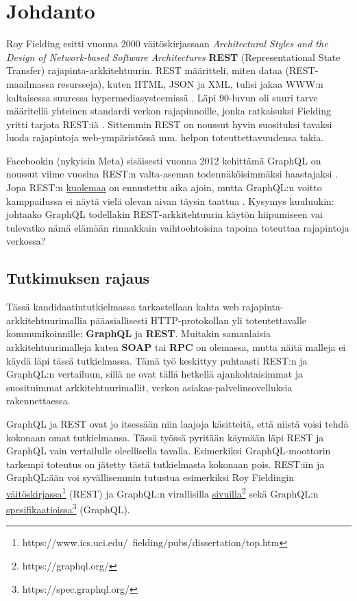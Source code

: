 \chapter{Johdanto} \label{Johdanto}

\setlength{\parindent}{0em}
\setlength{\parskip}{1em}

Roy Fielding esitti vuonna 2000 väitöskirjassaan \textit{Architectural Styles and the Design of Network-based Software Architectures} \textbf{REST} (Representational State Transfer) rajapinta-arkkitehtuurin. REST määritteli, miten dataa (REST-maailmassa resursseja), kuten HTML, JSON ja XML, tulisi jakaa WWW:n kaltaisessa suuressa hypermediasysteemissä \cite{FieldingRThesis}. Läpi 90-luvun oli suuri tarve määritellä yhteinen standardi verkon rajapinnoille, jonka ratkaisuksi Fielding yritti tarjota REST:iä \cite{FactsAboutW3C}. Sittemmin REST on noussut hyvin suosituksi tavaksi luoda rajapintoja web-ympäristössä mm. helpon toteuttettavuudensa takia.

Facebookin (nykyisin Meta) sisäisesti vuonna 2012 kehittämä GraphQL on noussut viime vuosina REST:n valta-aseman todennäköisimmäksi haastajaksi \cite{graphql-intro}. Jopa REST:n \href{https://www.stridenyc.com/podcasts/52-is-2018-the-year-graphql-kills-rest}{kuolemaa} on ennustettu aika ajoin, mutta GraphQL:n voitto kamppailussa ei näytä vielä olevan aivan täysin taattua \cite{the-year-graphql-kills-rest}. Kysymys kuuluukin: johtaako GraphQL todellakin REST-arkkitehtuurin käytön hiipumiseen vai tulevatko nämä elämään rinnakkain vaihtoehtoisina tapoina toteuttaa rajapintoja verkossa?


\section{Tutkimuksen rajaus}

Tässä kandidaatintutkielmassa tarkastellaan kahta web rajapinta-arkkitehtuurimallia pääasiallisesti HTTP-protokollan yli toteutettavalle kommunikoinnille: \textbf{GraphQL} ja \textbf{REST}. Muitakin samanlaisia arkkitehtuurimalleja kuten \textbf{SOAP} tai \textbf{RPC} on olemassa, mutta näitä malleja ei käydä läpi tässä tutkielmassa. Tämä työ keskittyy puhtaasti REST:n ja GraphQL:n vertailuun, sillä ne ovat tällä hetkellä ajankohtaisimmat ja suosituimmat arkkitehtuurimallit, verkon asiakas-palvelinsovelluksia rakennettaessa.

GraphQL ja REST ovat jo itsessään niin laajoja käsitteitä, että niistä voisi tehdä kokonaan omat tutkielmansa. Tässä työssä pyritään käymään läpi REST ja GraphQL vain vertailulle oleellisella tavalla. Esimerkiksi GraphQL-moottorin tarkempi toteutus on jätetty tästä tutkielmasta kokonaan pois. REST:iin ja GraphQL:ään voi syvällisemmin tutustua esimerkiksi Roy Fieldingin \href{https://www.ics.uci.edu/~fielding/pubs/dissertation/top.htm}{väitöskirjassa}\footnote{https://www.ics.uci.edu/~fielding/pubs/dissertation/top.htm} (REST) ja GraphQL:n virallisilla \href{https://graphql.org/}{sivuilla}\footnote{https://graphql.org/} sekä GraphQL:n \href{https://spec.graphql.org/}{spesifikaatioissa}\footnote{https://spec.graphql.org/} (GraphQL).

